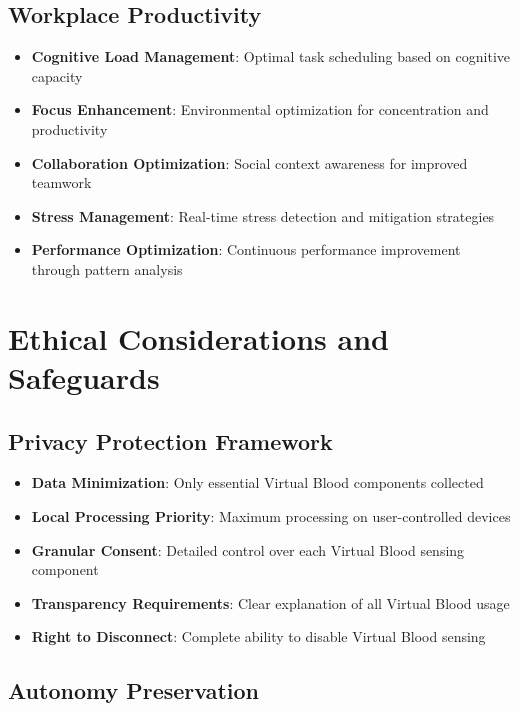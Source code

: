 \documentclass[12pt,a4paper]{article}
\begin{document}
\subsection{Workplace Productivity}

\begin{itemize}
\item \textbf{Cognitive Load Management}: Optimal task scheduling based on cognitive capacity
\item \textbf{Focus Enhancement}: Environmental optimization for concentration and productivity
\item \textbf{Collaboration Optimization}: Social context awareness for improved teamwork
\item \textbf{Stress Management}: Real-time stress detection and mitigation strategies
\item \textbf{Performance Optimization}: Continuous performance improvement through pattern analysis
\end{itemize}

\section{Ethical Considerations and Safeguards}

\subsection{Privacy Protection Framework}

\begin{itemize}
\item \textbf{Data Minimization}: Only essential Virtual Blood components collected
\item \textbf{Local Processing Priority}: Maximum processing on user-controlled devices
\item \textbf{Granular Consent}: Detailed control over each Virtual Blood sensing component
\item \textbf{Transparency Requirements}: Clear explanation of all Virtual Blood usage
\item \textbf{Right to Disconnect}: Complete ability to disable Virtual Blood sensing
\end{itemize}

\subsection{Autonomy Preservation}
\end{document}
